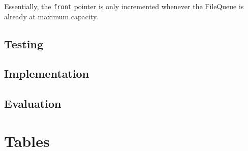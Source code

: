 \documentclass[11pt]{article}
\begin{document}
                Essentially, the \verb|front| pointer is only incremented whenever the FileQueue is already at maximum capacity.

            
        \subsection{Testing}
        \subsection{Implementation}
        \subsection{Evaluation}


    \newpage
    \appendix

    \newpage
    \section{Tables}
\end{document}
